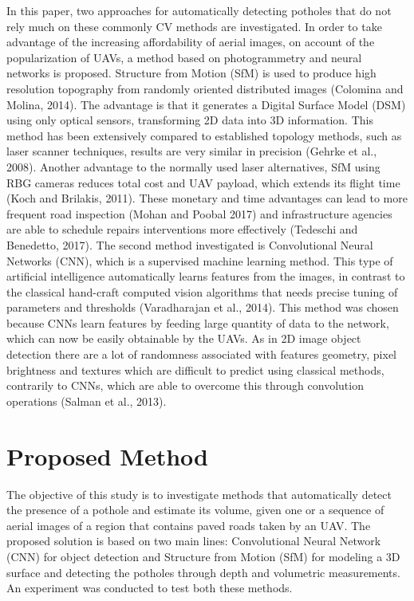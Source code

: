 \documentclass{article}
\begin{document}
In this paper, two approaches for automatically detecting potholes that do not rely much on these commonly CV methods are investigated. In order to take advantage of the increasing affordability of aerial images, on account of the popularization of UAVs, a method based on photogrammetry and neural networks is proposed. Structure from Motion (SfM) is used to produce high resolution topography from randomly oriented distributed images (Colomina and Molina, 2014). The advantage is that it generates a Digital Surface Model (DSM) using only optical sensors, transforming 2D data into 3D information. This method has been extensively compared to established topology methods, such as laser scanner techniques, results are very similar in precision (Gehrke et al., 2008). Another advantage to the normally used laser alternatives, SfM using RBG cameras reduces total cost and UAV payload, which extends its flight time (Koch and Brilakis, 2011). These monetary and time advantages can lead to more frequent road inspection (Mohan and Poobal 2017) and infrastructure agencies are able to schedule repairs interventions more effectively (Tedeschi and Benedetto, 2017). The second method investigated is Convolutional Neural Networks (CNN), which is a supervised machine learning method. This type of artificial intelligence automatically learns features from the images, in contrast to the classical hand-craft computed vision algorithms that needs precise tuning of parameters and thresholds (Varadharajan et al., 2014). This method was chosen because CNNs learn features by feeding large quantity of data to the network, which can now be easily obtainable by the UAVs. As in 2D image object detection there are a lot of randomness associated with features geometry, pixel brightness and textures which are difficult to predict using classical methods, contrarily to CNNs, which are able to overcome this through convolution operations (Salman et al., 2013).

\section{Proposed Method}
\label{sec:method}

The objective of this study is to investigate methods that automatically detect the presence of a pothole and estimate its volume, given one or a sequence of aerial images of a region that contains paved roads taken by an UAV.
The proposed solution is based on two main lines: Convolutional Neural Network (CNN) for object detection and Structure from Motion (SfM) for modeling a 3D surface and detecting the potholes through depth and volumetric measurements. An experiment was conducted to test both these methods.
\end{document}
